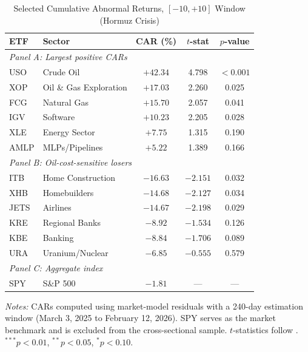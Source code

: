 \documentclass[12pt,preprint,authoryear]{elsarticle}
\begin{document}
\begin{table}[H]
\centering
\caption{Selected Cumulative Abnormal Returns, $[-10, +10]$ Window (Hormuz Crisis)}
\label{tab:cars}
\begin{threeparttable}
\begin{tabular}{llccc}
\toprule
ETF & Sector & CAR (\%) & $t$-stat & $p$-value \\
\midrule
\multicolumn{5}{l}{\textit{Panel A: Largest positive CARs}} \\
USO & Crude Oil & $+42.34$ & 4.798 & $< 0.001$ \\
XOP & Oil \& Gas Exploration & $+17.03$ & 2.260 & 0.025 \\
FCG & Natural Gas & $+15.70$ & 2.057 & 0.041 \\
IGV & Software & $+10.23$ & 2.205 & 0.028 \\
XLE & Energy Sector & $+7.75$ & 1.315 & 0.190 \\
AMLP & MLPs/Pipelines & $+5.22$ & 1.389 & 0.166 \\
\midrule
\multicolumn{5}{l}{\textit{Panel B: Oil-cost-sensitive losers}} \\
ITB & Home Construction & $-16.63$ & $-2.151$ & 0.032 \\
XHB & Homebuilders & $-14.68$ & $-2.127$ & 0.034 \\
JETS & Airlines & $-14.67$ & $-2.198$ & 0.029 \\
KRE & Regional Banks & $-8.92$ & $-1.534$ & 0.126 \\
KBE & Banking & $-8.84$ & $-1.706$ & 0.089 \\
URA & Uranium/Nuclear & $-6.85$ & $-0.555$ & 0.579 \\
\midrule
\multicolumn{5}{l}{\textit{Panel C: Aggregate index}} \\
SPY & S\&P 500 & $-1.81$ & --- & --- \\
\bottomrule
\end{tabular}
\begin{tablenotes}[flushleft]\footnotesize
\item \textit{Notes:} CARs computed using market-model residuals with a 240-day estimation window (March 3, 2025 to February 12, 2026). SPY serves as the market benchmark and is excluded from the cross-sectional sample. $t$-statistics follow \citet{kolari2010event}. $^{***}p<0.01$, $^{**}p<0.05$, $^{*}p<0.10$.
\end{tablenotes}
\end{threeparttable}
\end{table}
\end{document}
